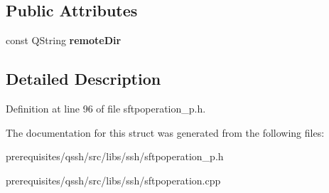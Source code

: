 \subsection*{Public Attributes}
\begin{DoxyCompactItemize}
\item 
\mbox{\label{struct_q_ssh_1_1_internal_1_1_sftp_rm_dir_a636b10e691027542fee9359e577b426c}} 
const Q\+String {\bfseries remote\+Dir}
\end{DoxyCompactItemize}


\subsection{Detailed Description}


Definition at line 96 of file sftpoperation\+\_\+p.\+h.



The documentation for this struct was generated from the following files\+:\begin{DoxyCompactItemize}
\item 
prerequisites/qssh/src/libs/ssh/sftpoperation\+\_\+p.\+h\item 
prerequisites/qssh/src/libs/ssh/sftpoperation.\+cpp\end{DoxyCompactItemize}
